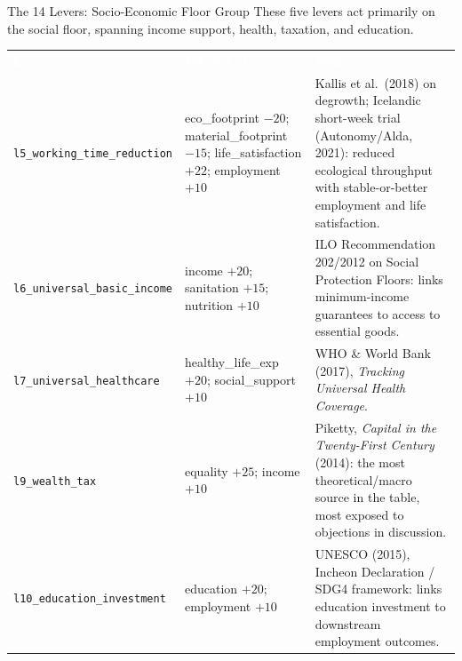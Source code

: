 \documentclass[11pt,aspectratio=169]{beamer}
\newcommand{\tblhead}[1]{\textcolor{white}{\textbf{#1}}}
\begin{document}
\begin{frame}{The 14 Levers: Socio-Economic Floor Group}
  \scriptsize
  These five levers act primarily on the \alert{social floor}, spanning income support, health, taxation, and education.
  \renewcommand{\arraystretch}{0.92}
  \begin{tabular}{@{}p{3.1cm}p{3.6cm}p{5cm}@{}}
    \rowcolor{doughnutblue} \tblhead{Lever} & \tblhead{Effect ($\Delta$)} & \tblhead{Source} \\
    \texttt{l5\_working\_time\_\allowbreak reduction} & eco\_footprint $-20$; material\_footprint $-15$; life\_satisfaction $+22$; employment $+10$ &
      Kallis et al.\ (2018) on degrowth; Icelandic short-week trial (Autonomy/Alda, 2021): reduced ecological throughput with stable-or-better employment and life satisfaction. \\
    \texttt{l6\_universal\_\allowbreak basic\_income} & income $+20$; sanitation $+15$; nutrition $+10$ &
      ILO Recommendation 202/2012 on Social Protection Floors: links minimum-income guarantees to access to essential goods. \\
    \texttt{l7\_universal\_\allowbreak healthcare} & healthy\_life\_exp $+20$; social\_support $+10$ &
      WHO \& World Bank (2017), \emph{Tracking Universal Health Coverage}. \\
    \texttt{l9\_wealth\_tax} & equality $+25$; income $+10$ &
      Piketty, \emph{Capital in the Twenty-First Century} (2014): the most theoretical/macro source in the table, most exposed to objections in discussion. \\
    \texttt{l10\_education\_\allowbreak investment} & education $+20$; employment $+10$ &
      UNESCO (2015), Incheon Declaration / SDG4 framework: links education investment to downstream employment outcomes. \\
  \end{tabular}
\end{frame}
\end{document}
